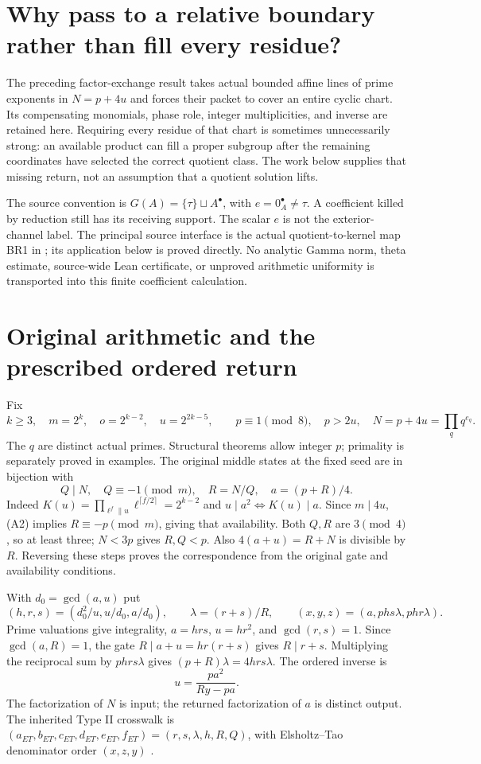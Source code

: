 \section{Why pass to a relative boundary rather than fill every residue?}
The preceding factor-exchange result takes actual bounded affine lines of prime
exponents in $N=p+4u$ and forces their packet to cover an entire cyclic chart.
Its compensating monomials, phase role, integer multiplicities, and inverse are
retained here. Requiring every residue of that chart is sometimes unnecessarily
strong: an available product can fill a proper subgroup after the remaining
coordinates have selected the correct quotient class. The work below supplies
that missing return, not an assumption that a quotient solution lifts.

The source convention is $G(A)=\{\tau\}\sqcup A^\bullet$, with
$e=0_A^\bullet\ne\tau$. A coefficient killed by reduction still has its receiving
support. The scalar $e$ is not the exterior-channel label. The principal source
interface is the actual quotient-to-kernel map BR1 in \cite{SZ}; its application
below is proved directly. No analytic Gamma norm, theta estimate, source-wide
Lean certificate, or unproved arithmetic uniformity is transported into this
finite coefficient calculation.

\section{Original arithmetic and the prescribed ordered return}
Fix
\[
 k\ge3,\quad m=2^k,\quad o=2^{k-2},\quad u=2^{2k-5},\qquad
 p\equiv1\pmod8,\quad p>2u,\quad N=p+4u=\prod_q q^{e_q}. \tag{A1}
\]
The $q$ are distinct actual primes. Structural theorems allow integer $p$;
primality is separately proved in examples. The original middle states at the
fixed seed are in bijection with
\[
 Q\mid N,\quad Q\equiv-1\pmod m,\quad R=N/Q,\quad a=(p+R)/4. \tag{A2}
\]
Indeed $K(u)=\prod_{\ell^f\parallel u}\ell^{\lceil f/2\rceil}=2^{k-2}$ and
$u\mid a^2\iff K(u)\mid a$. Since $m\mid4u$, (A2) implies
$R\equiv-p\pmod m$, giving that availability. Both $Q,R$ are $3\pmod4$, so
at least three; $N<3p$ gives $R,Q<p$. Also $4(a+u)=R+N$ is divisible by $R$.
Reversing these steps proves the correspondence from the original gate and
availability conditions.

With $d_0=\gcd(a,u)$ put
\[
 (h,r,s)=\left(d_0^2/u,u/d_0,a/d_0\right),\qquad
 \lambda=(r+s)/R,\qquad (x,y,z)=(a,phs\lambda,phr\lambda). \tag{A3}
\]
Prime valuations give integrality, $a=hrs$, $u=hr^2$, and $\gcd(r,s)=1$.
Since $\gcd(a,R)=1$, the gate $R\mid a+u=hr(r+s)$ gives $R\mid r+s$.
Multiplying the reciprocal sum by $phrs\lambda$ gives
$(p+R)\lambda=4hrs\lambda$. The ordered inverse is
\[
 \boxed{u=\frac{pa^2}{Ry-pa}.}                              \tag{A4}
\]
The factorization of $N$ is input; the returned factorization of $a$ is distinct
output. The inherited Type II crosswalk is
$(a_{ET},b_{ET},c_{ET},d_{ET},e_{ET},f_{ET})=(r,s,\lambda,h,R,Q)$, with
Elsholtz--Tao denominator order $(x,z,y)$ \cite[\S2, (2.13)--(2.22)]{ET}.

